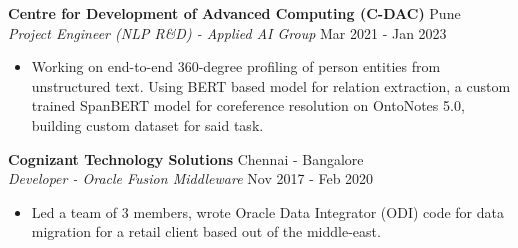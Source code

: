 \documentclass[a4paper]{article}
\begin{document}
\vspace{1mm}
\textbf{Centre for Development of Advanced Computing (C-DAC)} \hfill Pune\\
\textit{Project Engineer (NLP R\&D) - Applied AI Group} \hfill Mar 2021 - Jan 2023\\
\vspace{-1mm}
\begin{itemize} \itemsep 1pt

    \item Working on end-to-end 360-degree profiling of person entities from unstructured text. Using BERT based model for relation extraction, a custom trained SpanBERT model for coreference resolution on OntoNotes 5.0, building custom dataset for said task.
\end{itemize}

\vspace*{2mm}

\textbf{Cognizant Technology Solutions} \hfill Chennai - Bangalore\\
\textit{Developer - Oracle Fusion Middleware} \hfill Nov 2017 - Feb 2020\\
\vspace{-1mm}
\begin{itemize} \itemsep 1pt
    \item Led a team of 3 members, wrote Oracle Data Integrator (ODI) code for data migration for a retail client based out of the middle-east.
\end{itemize}
\end{document}
